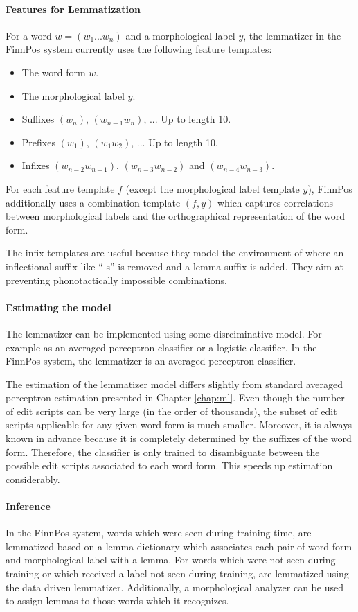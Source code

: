 \paragraph{Features for Lemmatization} For a word $w = (w_1...w_n)$ and
a morphological label $y$, the lemmatizer in the FinnPos system
currently uses the following feature templates:
\begin{itemize}
\item The word form $w$.
\item The morphological label $y$.
\item Suffixes $(w_n)$, $(w_{n-1}w_n)$, ... Up to length 10.
\item Prefixes $(w_1)$, $(w_1w_2)$, ... Up to length 10.
\item Infixes $(w_{n-2}w_{n-1})$, $(w_{n-3}w_{n-2})$ and $(w_{n-4}w_{n-3})$.
\end{itemize}
For each feature template $f$ (except the morphological label template
$y$), FinnPos additionally uses a combination template $(f,y)$ which
captures correlations between morphological labels and the
orthographical representation of the word form.

The infix templates are useful because they model the environment of
where an inflectional suffix like ``-s'' is removed and a lemma suffix
is added. They aim at preventing phonotactically impossible
combinations.

\paragraph{Estimating the model} The lemmatizer can be implemented
using some disrciminative model. For example as an averaged perceptron
classifier or a logistic classifier. In the FinnPos system, the
lemmatizer is an averaged perceptron classifier.

The estimation of the lemmatizer model differs slightly from standard
averaged perceptron estimation presented in Chapter
\ref{chap:ml}. Even though the number of edit scripts can be very
large (in the order of thousands), the subset of edit scripts
applicable for any given word form is much smaller. Moreover, it is
always known in advance because it is completely determined by the
suffixes of the word form. Therefore, the classifier is only trained
to disambiguate between the possible edit scripts associated to each
word form. This speeds up estimation considerably.

\paragraph{Inference} In the FinnPos system, words which were seen
during training time, are lemmatized based on a lemma dictionary which
associates each pair of word form and morphological label with a
lemma. For words which were not seen during training or which received
a label not seen during training, are lemmatized using the data driven
lemmatizer. Additionally, a morphological analyzer can be used to
assign lemmas to those words which it recognizes.

